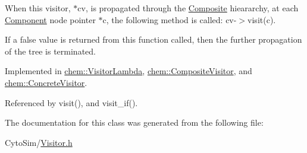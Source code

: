 When this visitor, $\ast$cv, is propagated through the \hyperlink{classchem_1_1Composite}{Composite} hieararchy, at each \hyperlink{classchem_1_1Component}{Component} node pointer $\ast$c, the following method is called\-: cv-\/$>$visit(c). 

If a false value is returned from this function called, then the further propagation of the tree is terminated. 

Implemented in \hyperlink{classchem_1_1VisitorLambda_ab44a2f2438782ec3651a1cdbfc8a67ff}{chem\-::\-Visitor\-Lambda}, \hyperlink{classchem_1_1CompositeVisitor_ac3104d5ec0d0628bbcc72f17f69b0396}{chem\-::\-Composite\-Visitor}, and \hyperlink{classchem_1_1ConcreteVisitor_a5dfd9a95b1c2b8bf73a643c20c7388bc}{chem\-::\-Concrete\-Visitor}.



Referenced by visit(), and visit\-\_\-if().



The documentation for this class was generated from the following file\-:\begin{DoxyCompactItemize}
\item 
Cyto\-Sim/\hyperlink{Visitor_8h}{Visitor.\-h}\end{DoxyCompactItemize}
